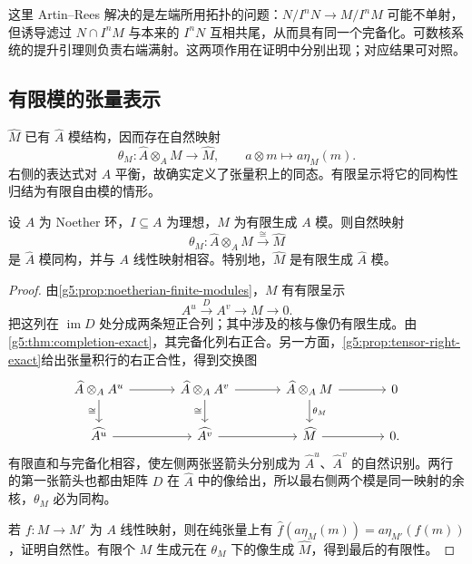 这里 Artin–Rees 解决的是左端所用拓扑的问题：\(N/I^nN\to M/I^nM\) 可能不单射，但诱导滤过 \(N\cap I^nM\) 与本来的 \(I^nN\) 互相共尾，从而具有同一个完备化。可数核系统的提升引理则负责右端满射。这两项作用在证明中分别出现；对应结果可对照\cite[第8节，定理8.1、8.6，第56—60页]{Matsumura1989}。

\subsection{有限模的张量表示}
\label{g5:subsec:0703:03}

\(\widehat M\) 已有 \(\widehat A\) 模结构，因而存在自然映射
\[
	\theta_M:\widehat A\otimes_A M\longrightarrow\widehat M,
	\qquad a\otimes m\longmapsto a\eta_M(m).
\]
右侧的表达式对 \(A\) 平衡，故确实定义了张量积上的同态。有限呈示将它的同构性归结为有限自由模的情形。

\begin{theorem}\label{g5:thm:completion-tensor}
	设 \(A\) 为 Noether 环，\(I\subseteq A\) 为理想，\(M\) 为有限生成 \(A\) 模。则自然映射
	\[
		\theta_M:\widehat A\otimes_A M\xrightarrow{\ \cong\ }\widehat M
	\]
	是 \(\widehat A\) 模同构，并与 \(A\) 线性映射相容。特别地，\(\widehat M\) 是有限生成 \(\widehat A\) 模。
\end{theorem}
\begin{proof}
	由\cref{g5:prop:noetherian-finite-modules}，\(M\) 有有限呈示
	\[
		A^u\xrightarrow{D}A^v\longrightarrow M\longrightarrow0.
	\]
	把这列在 \(\operatorname{im}D\) 处分成两条短正合列；其中涉及的核与像仍有限生成。由\cref{g5:thm:completion-exact}，其完备化列右正合。另一方面，\cref{g5:prop:tensor-right-exact}给出张量积行的右正合性，得到交换图
	\[
		\begin{tikzcd}[column sep=large]
			\widehat A\otimes_A A^u \arrow[r] \arrow[d,"\cong"'] &
			\widehat A\otimes_A A^v \arrow[r] \arrow[d,"\cong"'] &
			\widehat A\otimes_A M \arrow[r] \arrow[d,"\theta_M"] & 0 \\
			\widehat{A^u} \arrow[r] & \widehat{A^v} \arrow[r] & \widehat M \arrow[r] & 0.
		\end{tikzcd}
	\]
	有限直和与完备化相容，使左侧两张竖箭头分别成为 \(\widehat A^u\)、\(\widehat A^v\) 的自然识别。两行的第一张箭头也都由矩阵 \(D\) 在 \(\widehat A\) 中的像给出，所以最右侧两个模是同一映射的余核，\(\theta_M\) 必为同构。

	若 \(f:M\to M'\) 为 \(A\) 线性映射，则在纯张量上有
	\(\widehat f(a\eta_M(m))=a\eta_{M'}(f(m))\)，证明自然性。有限个 \(M\) 生成元在 \(\theta_M\) 下的像生成 \(\widehat M\)，得到最后的有限性。
\end{proof}

